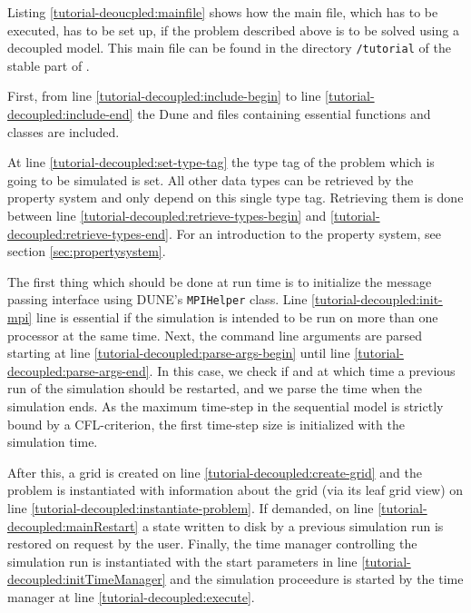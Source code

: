 Listing \ref{tutorial-deoucpled:mainfile} shows how the main file, which has to be executed, has to be set up, if the problem described above is to be solved using a decoupled model. This main file can be found in the directory \texttt{/tutorial} of the stable part of \Dumux.

\begin{lst}\label{tutorial-deoucpled:mainfile} \mbox{}

\end{lst}

First, from line \ref{tutorial-decoupled:include-begin} to line
\ref{tutorial-decoupled:include-end} the Dune and \Dumux files containing
essential functions and classes are included.

At line \ref{tutorial-decoupled:set-type-tag} the type tag of the
problem which is going to be simulated is set. All other data types
can be retrieved by the \Dumux property system and only depend on this
single type tag. Retrieving them is done between line
\ref{tutorial-decoupled:retrieve-types-begin} and
\ref{tutorial-decoupled:retrieve-types-end}. For an introduction to the
property system, see section \ref{sec:propertysystem}.

The first thing which should be done at run time is to initialize the
message passing interface using DUNE's \texttt{MPIHelper} class. Line
\ref{tutorial-decoupled:init-mpi} line is essential if the simulation is
intended to be run on more than one processor at the same time. Next,
the command line arguments are parsed starting at line
\ref{tutorial-decoupled:parse-args-begin} until line
\ref{tutorial-decoupled:parse-args-end}. In this case, we check if and
at which time a previous run of the simulation should be restarted, and we
parse the time when the simulation ends. As the maximum time-step in the 
sequential model is strictly bound by a CFL-criterion, the first time-step
size is initialized with the simulation time.

After this, a grid is created on line \ref{tutorial-decoupled:create-grid} 
and the problem is instantiated with information about the grid
(via its leaf grid view) on line \ref{tutorial-decoupled:instantiate-problem}.
If demanded, on line \ref{tutorial-decoupled:mainRestart} a state written to
disk by a previous simulation run is restored on request by the user.
Finally, the time manager controlling the simulation run is instantiated 
with the start parameters in line \ref{tutorial-decoupled:initTimeManager}
and the simulation proceedure is started by the time manager at line
\ref{tutorial-decoupled:execute}.



